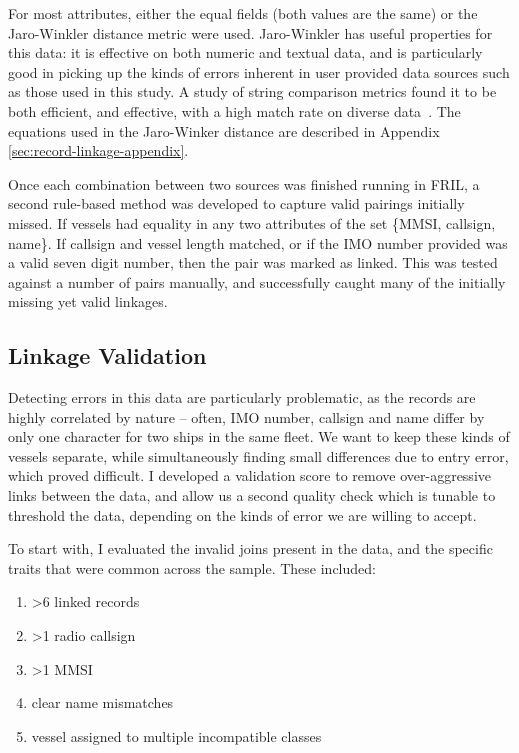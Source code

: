 For most attributes, either the equal fields (both values are the same) or the Jaro-Winkler distance metric were used. Jaro-Winkler has useful properties for this data: it is effective on both numeric and textual data, and is particularly good in picking up the kinds of errors inherent in user provided data sources such as those used in this study. A study of string comparison metrics found it to be both efficient, and effective, with a high match rate on diverse data~\citep{Cohen2003}. The equations used in the Jaro-Winker distance are described in Appendix \ref{sec:record-linkage-appendix}.

Once each combination between two sources was finished running in FRIL, a second rule-based method was developed to capture valid pairings initially missed. If vessels had equality in any two attributes of the set \{MMSI, callsign, name\}.  If callsign and vessel length matched, or if the IMO number provided was a valid seven digit number, then the pair was marked as linked. This was tested against a number of pairs manually, and successfully caught many of the initially missing yet valid linkages.

\subsection{Linkage Validation}

Detecting errors in this data are particularly problematic, as the records are highly correlated by nature -- often, IMO number, callsign and name differ by only one character for two ships in the same fleet. We want to keep these kinds of vessels separate, while simultaneously finding small differences due to entry error, which proved difficult. I developed a validation score to remove over-aggressive links between the data, and allow us a second quality check which is tunable to threshold the data, depending on the kinds of error we are willing to accept.

To start with, I evaluated the invalid joins present in the data, and the specific traits that were common across the sample. These included:
\begin{enumerate}[noitemsep]
 \item >6 linked records
 \item >1 radio callsign
 \item >1 MMSI
 \item clear name mismatches
 \item vessel assigned to multiple incompatible classes
\end{enumerate}

